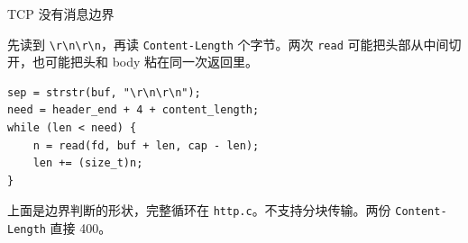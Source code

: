 \documentclass[aspectratio=169,11pt,professionalfonts]{ctexbeamer}
\begin{document}
\begin{frame}[fragile]{TCP 没有消息边界}
\begin{center}
\setlength{\fboxsep}{5pt}
%
%
\end{center}
\vspace{0.15em}
先读到 \texttt{\textbackslash r\textbackslash n\textbackslash r\textbackslash n}，再读 \texttt{Content-Length} 个字节。两次 \texttt{read} 可能把头部从中间切开，也可能把头和 body 粘在同一次返回里。
\begin{lstlisting}[style=snippet]
sep = strstr(buf, "\r\n\r\n");
need = header_end + 4 + content_length;
while (len < need) {
    n = read(fd, buf + len, cap - len);
    len += (size_t)n;
}
\end{lstlisting}
\vspace{-0.2em}
{\scriptsize 上面是边界判断的形状，完整循环在 \texttt{http.c}。不支持分块传输。两份 \texttt{Content-Length} 直接 400。}
\end{frame}
\end{document}
